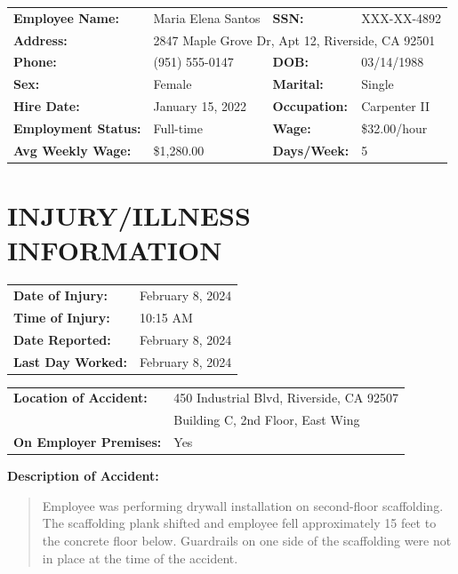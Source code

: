 \documentclass[11pt]{article}
\begin{document}
\begin{tabular}{@{}p{4cm}p{5cm}p{2cm}p{3.5cm}@{}}
\textbf{Employee Name:} & Maria Elena Santos & \textbf{SSN:} & XXX-XX-4892 \\
\textbf{Address:} & \multicolumn{3}{l}{2847 Maple Grove Dr, Apt 12, Riverside, CA 92501} \\
\textbf{Phone:} & (951) 555-0147 & \textbf{DOB:} & 03/14/1988 \\
\textbf{Sex:} & Female & \textbf{Marital:} & Single \\
\textbf{Hire Date:} & January 15, 2022 & \textbf{Occupation:} & Carpenter II \\
\textbf{Employment Status:} & Full-time & \textbf{Wage:} & \$32.00/hour \\
\textbf{Avg Weekly Wage:} & \$1,280.00 & \textbf{Days/Week:} & 5 \\
\end{tabular}

\section*{INJURY/ILLNESS INFORMATION}

\begin{tabular}{@{}p{4cm}p{10cm}@{}}
\textbf{Date of Injury:} & February 8, 2024 \\
\textbf{Time of Injury:} & 10:15 AM \\
\textbf{Date Reported:} & February 8, 2024 \\
\textbf{Last Day Worked:} & February 8, 2024 \\
\end{tabular}

\vspace{0.5em}

\begin{tabular}{@{}p{4cm}p{10cm}@{}}
\textbf{Location of Accident:} & 450 Industrial Blvd, Riverside, CA 92507 \\
& Building C, 2nd Floor, East Wing \\
\textbf{On Employer Premises:} & Yes \\
\end{tabular}

\vspace{0.5em}

\textbf{Description of Accident:}
\begin{quote}
Employee was performing drywall installation on second-floor scaffolding. The scaffolding plank shifted and employee fell approximately 15 feet to the concrete floor below. Guardrails on one side of the scaffolding were not in place at the time of the accident.
\end{quote}
\end{document}
